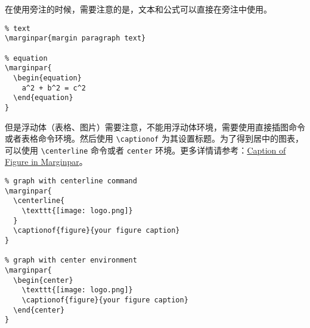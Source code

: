 \begin{remark}
在使用旁注的时候，需要注意的是，文本和公式可以直接在旁注中使用。

\begin{lstlisting}
% text
\marginpar{margin paragraph text}

% equation
\marginpar{
  \begin{equation}
    a^2 + b^2 = c^2
  \end{equation}
}
\end{lstlisting}

但是浮动体（表格、图片）需要注意，不能用浮动体环境，需要使用直接插图命令或者表格命令环境。然后使用 \lstinline{\captionof} 为其设置标题。为了得到居中的图表，可以使用 \lstinline{\centerline} 命令或者 \lstinline{center} 环境。更多详情请参考：\href{https://tex.stackexchange.com/questions/5583/caption-of-figure-in-marginpar-and-caption-of-wrapfigure-in-margin}{Caption of Figure in Marginpar}。

\begin{lstlisting}
% graph with centerline command
\marginpar{
  \centerline{
    \texttt{[image: logo.png]}
  }
  \captionof{figure}{your figure caption}
}

% graph with center environment
\marginpar{
  \begin{center}
    \texttt{[image: logo.png]}
    \captionof{figure}{your figure caption}
  \end{center}
}
\end{lstlisting}

\end{remark}


